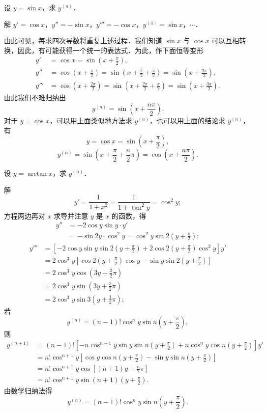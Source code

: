 \begin{example}\label{ex:4-4-2}
设 $y=\sin x$，求 $y^{(n)}$．

解 $y'=\cos x$，$y''=-\sin x$，$y'''=-\cos x$，$y^{(4)}=\sin x$，$\cdots$．

由此可见，每求四次导数将重复上述过程．我们知道 $\sin x$ 与 $\cos x$ 可以互相转换，因此，有可能获得一个统一的表达式．为此，作下面恒等变形
\[
\begin{aligned}
y'&=\cos x=\sin\left(x+\frac{\pi}{2}\right),\\
y''&=\cos\left(x+\frac{\pi}{2}\right)=\sin\left(x+\frac{\pi}{2}+\frac{\pi}{2}\right)=\sin\left(x+\frac{2\pi}{2}\right),\\
y'''&=\cos\left(x+\frac{2\pi}{2}\right)=\sin\left(x+\frac{2\pi}{2}+\frac{\pi}{2}\right)=\sin\left(x+\frac{3\pi}{2}\right).
\end{aligned}
\]
由此我们不难归纳出
\[
y^{(n)}=\sin\left(x+\frac{n\pi}{2}\right).
\]
对于 $y=\cos x$，可以用上面类似地方法求 $y^{(n)}$，也可以用上面的结论求 $y^{(n)}$，有
\[
y=\cos x=\sin\left(x+\frac{\pi}{2}\right),
\]
\[
y^{(n)}=\sin\left(x+\frac{\pi}{2}+\frac{n}{2}\pi\right)=\cos\left(x+\frac{n\pi}{2}\right).
\]
\end{example}

\begin{example}\label{ex:4-4-3}
设 $y=\arctan x$，求 $y^{(n)}$．

解
\[
y'=\frac{1}{1+x^{2}}=\frac{1}{1+\tan^{2}y}=\cos^{2}y;
\]
方程两边再对 $x$ 求导并注意 $y$ 是 $x$ 的函数，得
\[
\begin{aligned}
y''&=-2\cos y\sin y\cdot y'\\
&=-\sin 2y\cdot\cos^{2}y=\cos^{2}y\sin 2\left(y+\frac{\pi}{2}\right);
\end{aligned}
\]
\[
\begin{aligned}
y'''&=\left[-2\cos y\sin y\sin 2\left(y+\frac{\pi}{2}\right)+2\cos 2\left(y+\frac{\pi}{2}\right)\cos^{2}y\right]y'\\
&=2\cos^{3}y\left[\cos 2\left(y+\frac{\pi}{2}\right)\cos y-\sin y\sin 2\left(y+\frac{\pi}{2}\right)\right]\\
&=2\cos^{3}y\cos\left(3y+\frac{2}{2}\pi\right)\\
&=2\cos^{3}y\sin\left(3y+\frac{3}{2}\pi\right)\\
&=2\cos^{3}y\sin 3\left(y+\frac{1}{2}\pi\right);
\end{aligned}
\]
若
\[
y^{(n)}=(n-1)!\cos^{n}y\sin n\left(y+\frac{\pi}{2}\right),
\]
则
\[
\begin{aligned}
y^{(n+1)}&=(n-1)!\left[-n\cos^{n-1}y\sin y\sin n\left(y+\frac{\pi}{2}\right)+n\cos^{n}y\cos n\left(y+\frac{\pi}{2}\right)\right]y'\\
&=n!\cos^{n+1}y\left[\cos y\cos n\left(y+\frac{\pi}{2}\right)-\sin y\sin n\left(y+\frac{\pi}{2}\right)\right]\\
&=n!\cos^{n+1}y\cos\left[(n+1)y+\frac{n}{2}\pi\right]\\
&=n!\cos^{n+1}y\sin(n+1)\left(y+\frac{\pi}{2}\right).
\end{aligned}
\]
由数学归纳法得
\[
y^{(n)}=(n-1)!\cos^{n}y\sin n\left(y+\frac{\pi}{2}\right).
\]
\end{example}

